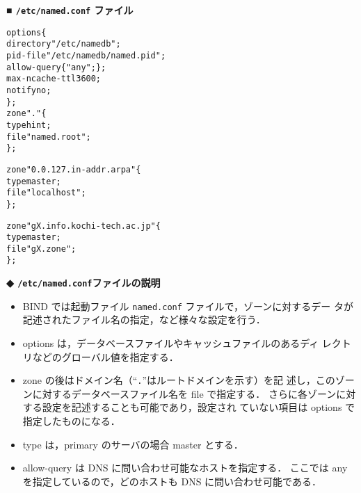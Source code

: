 \noindent
\textbf{■ \texttt{/etc/named.conf} ファイル}
\begin{center}
\begin{breakbox}
\begin{alltt}
options \{
        directory "/etc/namedb";
        pid-file "/etc/namedb/named.pid"; 
        allow-query \{ "any"; \};
        max-ncache-ttl 3600;
        notify no;
\};
zone "." \{
        type hint;
        file "named.root";
\};

zone "0.0.127.in-addr.arpa" \{
        type master;
        file "localhost";
\};

zone "gX.info.kochi-tech.ac.jp" \{
        type master;
        file "gX.zone";
\};

\end{alltt}
\end{breakbox}
\end{center}
\noindent
\textbf{◆ \texttt{/etc/named.conf}ファイルの説明}
\begin{itemize}
\item BIND では起動ファイル \texttt{named.conf} ファイルで，ゾーンに対するデー
タが記述されたファイル名の指定，など様々な設定を行う．
\item options は，データベースファイルやキャッシュファイルのあるディ
レクトリなどのグローバル値を指定する．
\item zone の後はドメイン名（``\verb|.|''はルートドメインを示す）を記
述し，このゾーンに対するデータベースファイル名を file で指定する．
さらに各ゾーンに対する設定を記述することも可能であり，設定され
ていない項目は options で指定したものになる．
\item type は，primary のサーバの場合 master とする．
\item allow-query は DNS に問い合わせ可能なホストを指定する．
ここでは any を指定しているので，どのホストも DNS に問い合わせ可能である．
\end{itemize}
